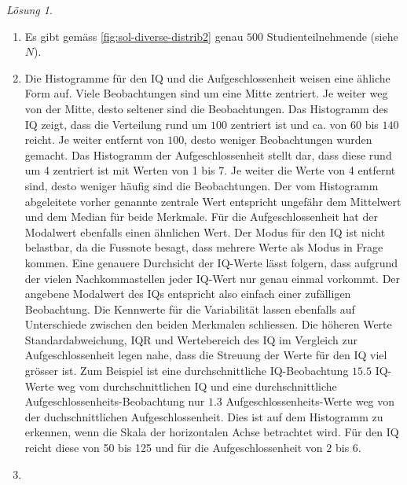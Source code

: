 \documentclass[
]{book}
\providecommand{\tightlist}{%
  \setlength{\itemsep}{0pt}\setlength{\parskip}{0pt}}
\theoremstyle{definition}
\theoremstyle{definition}
\theoremstyle{definition}
\theoremstyle{definition}
\theoremstyle{remark}
\newtheorem*{solution}{Lösung}
\begin{document}
\begin{solution}
\begin{enumerate}
\def\labelenumi{\alph{enumi}.}
\tightlist
\item
  Es gibt gemäss \ref{fig:sol-diverse-distrib2} genau \(500\) Studienteilnehmende (siehe \(N\)).
\item
  Die Histogramme für den IQ und die Aufgeschlossenheit weisen eine ähliche Form auf. Viele Beobachtungen sind um eine Mitte zentriert. Je weiter weg von der Mitte, desto seltener sind die Beobachtungen. Das Histogramm des IQ zeigt, dass die Verteilung rund um \(100\) zentriert ist und ca. von \(60\) bis \(140\) reicht. Je weiter entfernt von \(100\), desto weniger Beobachtungen wurden gemacht. Das Histogramm der Aufgeschlossenheit stellt dar, dass diese rund um 4 zentriert ist mit Werten von 1 bis 7. Je weiter die Werte von 4 entfernt sind, desto weniger häufig sind die Beobachtungen. Der vom Histogramm abgeleitete vorher genannte zentrale Wert entspricht ungefähr dem Mittelwert und dem Median für beide Merkmale. Für die Aufgeschlossenheit hat der Modalwert ebenfalls einen ähnlichen Wert. Der Modus für den IQ ist nicht belastbar, da die Fussnote besagt, dass mehrere Werte als Modus in Frage kommen. Eine genauere Durchsicht der IQ-Werte lässt folgern, dass aufgrund der vielen Nachkommastellen jeder IQ-Wert nur genau einmal vorkommt. Der angebene Modalwert des IQs entspricht also einfach einer zufälligen Beobachtung. Die Kennwerte für die Variabilität lassen ebenfalls auf Unterschiede zwischen den beiden Merkmalen schliessen. Die höheren Werte Standardabweichung, IQR und Wertebereich des IQ im Vergleich zur Aufgeschlossenheit legen nahe, dass die Streuung der Werte für den IQ viel grösser ist. Zum Beispiel ist eine durchschnittliche IQ-Beobachtung \(15.5\) IQ-Werte weg vom durchschnittlichen IQ und eine durchschnittliche Aufgeschlossenheits-Beobachtung nur \(1.3\) Aufgeschlossenheits-Werte weg von der duchschnittlichen Aufgeschlossenheit. Dies ist auf dem Histogramm zu erkennen, wenn die Skala der horizontalen Achse betrachtet wird. Für den IQ reicht diese von 50 bis 125 und für die Aufgeschlossenheit von \(2\) bis \(6\).
\item

\end{enumerate}
\end{solution}
\end{document}
